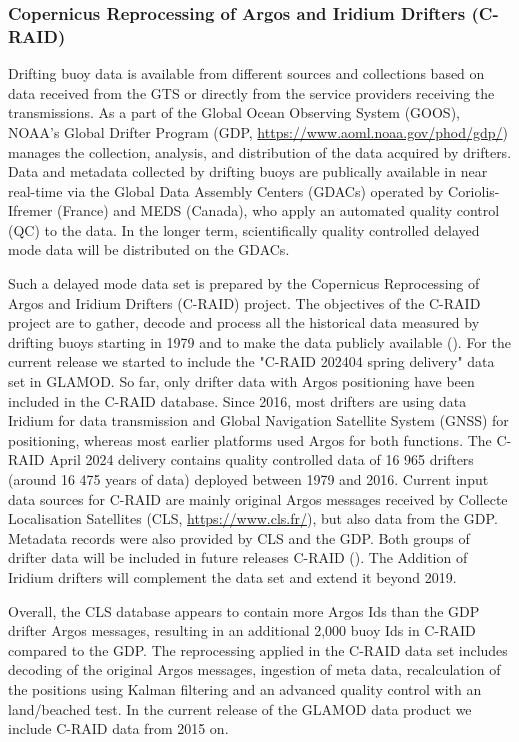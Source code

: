 \subsubsection{Copernicus Reprocessing of Argos and Iridium Drifters (C-RAID)}

Drifting buoy data is available from different sources and collections based on data received from the GTS or directly from the service providers receiving the transmissions.
As a part of the  Global Ocean Observing System (GOOS), NOAA's Global Drifter Program (GDP, \url{https://www.aoml.noaa.gov/phod/gdp/}) manages the collection, analysis, and distribution of the data acquired by drifters. 
Data and metadata collected by drifting buoys are publically available in near real-time via the Global Data Assembly Centers (GDACs) operated by Coriolis-Ifremer (France) and MEDS (Canada), who apply an automated quality control (QC) to the data.
In the longer term, scientifically quality controlled delayed mode data will be distributed on the GDACs.

Such a delayed mode data set is prepared by the Copernicus Reprocessing of Argos and Iridium Drifters (C-RAID) project.
The objectives of the C-RAID project are to gather, decode and process all the historical data measured by drifting buoys starting in 1979 and to make the data publicly available (\cite{craid202404}).
For the current release we started to include the "C-RAID 202404 spring delivery" data set in GLAMOD.
So far, only drifter data with Argos positioning have been included in the C-RAID database.
Since 2016, most drifters are using data Iridium for data transmission and Global Navigation Satellite System (GNSS) for positioning, whereas most earlier platforms used Argos for both functions.
The C-RAID April 2024 delivery contains quality controlled data of 16 965 drifters (around 16 475 years of data) deployed between 1979 and 2016.
Current input data sources for C-RAID are mainly original Argos messages received by 
Collecte Localisation Satellites (CLS, \url{https://www.cls.fr/}), but also data from the GDP.
Metadata records were also provided by CLS and the GDP.
Both groups of drifter data will be included in future releases C-RAID (\cite{craid202404activity}). The Addition of Iridium drifters will complement the data set and extend it beyond 2019.

Overall, the CLS database appears to contain more Argos Ids than the GDP drifter Argos messages, resulting in an additional 2,000 buoy Ids in C-RAID compared to the GDP.
The reprocessing applied in the C-RAID data set includes decoding of the original Argos messages, ingestion of meta data, recalculation of the positions using Kalman filtering and an advanced quality control with an land/beached test.
In the current release of the GLAMOD data product we include C-RAID data from 2015 on. 


